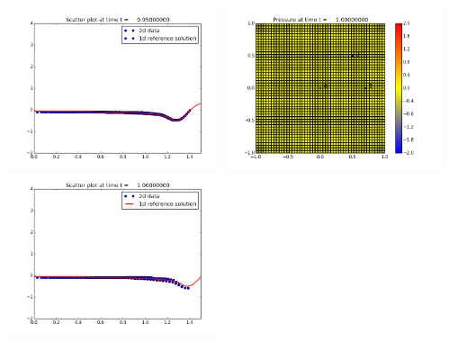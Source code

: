 \documentclass[11pt]{article}
\begin{document}
\includegraphics[width=0.475\textwidth]{frame0019fig3.png}
\vskip 10pt 
\includegraphics[width=0.475\textwidth]{frame0020fig0.png}
\includegraphics[width=0.475\textwidth]{frame0020fig3.png}
\end{document}
